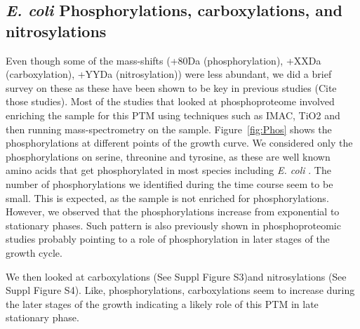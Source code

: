 \documentclass[12pt]{article}
\begin{document}


\subsection{\emph{E. coli} Phosphorylations, carboxylations, and nitrosylations}

Even though some of the mass-shifts (+80Da (phosphorylation), +XXDa (carboxylation), +YYDa (nitrosylation)) were less abundant, we did a brief survey on these as these have been shown to be key in previous studies (Cite those studies). Most of the studies that looked at phosphoproteome involved enriching the sample for this PTM using techniques such as IMAC, TiO2 and then running mass-spectrometry on the sample. Figure~\ref{fig:Phos} shows the phosphorylations at different points of the growth curve. We considered only the phosphorylations on serine, threonine and tyrosine, as these are well known amino acids that get phosphorylated in most species including \emph{E. coli} \cite{Maceketal2008}. The number of phosphorylations we identified during the time course seem to be small. This is expected, as the sample is not enriched for phosphorylations. However, we observed that the phosphorylations increase from exponential to stationary phases. Such pattern is also previously shown in phosphoproteomic studies \cite{Soaresetal2013} probably pointing to a role of phosphorylation in later stages of the growth cycle.

We then looked at carboxylations (See Suppl Figure S3)and nitrosylations (See Suppl Figure S4). Like, phosphorylations, carboxylations seem to increase during the later stages of the growth indicating a likely role of this PTM in late stationary phase. 
\end{document}

